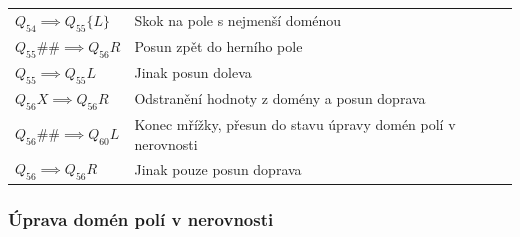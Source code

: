 \noindent
\begin{tabular}{@{}p{4cm} p{10.5cm}@{}}
    \(Q_{54} \implies Q_{55}\{L\}\) & Skok na pole s nejmenší doménou \\
    \(Q_{55}\#\# \implies Q_{56}R\) & Posun zpět do herního pole \\
    \(Q_{55} \implies Q_{55}L\) & Jinak posun doleva \\

    \(Q_{56}X \implies Q_{56}R\) & Odstranění hodnoty z domény a posun
        doprava \\
    \(Q_{56}\#\# \implies Q_{60}L\) & Konec mřížky, přesun do stavu úpravy
        domén polí v nerovnosti \\
    \(Q_{56} \implies Q_{56}R\) & Jinak pouze posun doprava \\
\end{tabular}

\subsubsection*{Úprava domén polí v nerovnosti}

